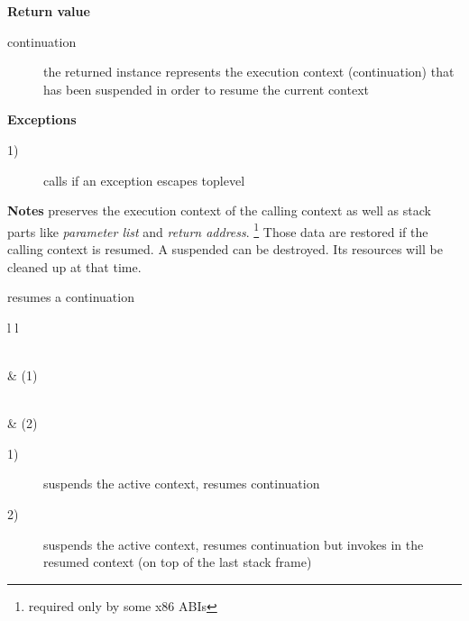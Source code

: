 {\bfseries Return value}
\begin{description}
    \item[continuation] the returned instance represents the execution context
                        (continuation) that has been suspended in order to
                        resume the current context
\end{description}

{\bfseries Exceptions}
\begin{description}
    \item[1)] calls  if an exception escapes toplevel
              \\
\end{description}

{\bfseries Notes}
\newline
\call preserves the execution context of the calling context as well as stack
parts like \emph{parameter list} and \emph{return address}.
\footnote{required only by some x86 ABIs} Those data are restored if the calling
context is resumed.
\newline
A suspended  can be destroyed. Its resources will be cleaned
up at that time.



resumes a continuation\\

\begin{tabular}{ l l }
    \midrule

    \\
     & (1)\\

    \midrule

    \\
     & (2)\\

    \midrule
\end{tabular}

\begin{description}
    \item[1)] suspends the active context, resumes continuation 
    \item[2)] suspends the active context, resumes continuation  but
              invokes  in the resumed context (on top of the
              last stack frame)
\end{description}

